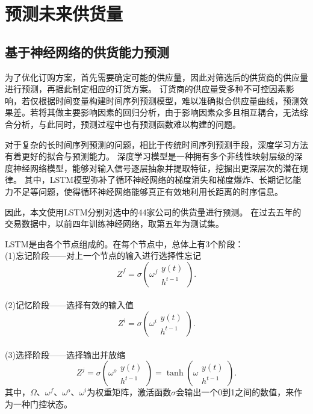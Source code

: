 
\section{预测未来供货量}
\subsection{基于神经网络的供货能力预测}

为了优化订购方案，首先需要确定可能的供应量，因此对筛选后的供货商的供应量进行预测，再据此制定相应的订货方案。
订货商的供应量受多种不可控因素影响，若仅根据时间变量构建时间序列预测模型，难以准确拟合供应量曲线，预测效果差。若将其做主要影响因素的回归分析，由于影响因素众多且相互耦合，无法综合分析，与此同时，预测过程中也有预测函数难以构建的问题\cite{李鹏2018基于长短期记忆的实时电价条件下智能电网短期负荷预测}。


对于复杂的长时间序列预测的问题，相比于传统时间序列预测手段，深度学习方法有着更好的拟合与预测能力。
深度学习模型是一种拥有多个非线性映射层级的深度神经网络模型，能够对输入信号逐层抽象并提取特征，挖掘出更深层次的潜在规律\cite{lecun2015deep}。
其中，LSTM模型弥补了循环神经网络的梯度消失和梯度爆炸、长期记忆能力不足等问题，使得循环神经网络能够真正有效地利用长距离的时序信息\cite{王鑫2018基于}。

因此，本文使用LSTM分别对选中的44家公司的供货量进行预测。
在过去五年的交易数据中，以前四年训练神经网络，取第五年为测试集。

LSTM是由各个节点组成的。在每个节点中，总体上有3个阶段：
\\
(1)忘记阶段——对上一个节点的输入进行选择性忘记
\begin{equation}
    Z^{f}=\sigma\left(\omega^{f} \begin{array}{l}
y(t) \\
h^{t-1}
\end{array}\right).
\end{equation}
\\
(2)记忆阶段——选择有效的输入值
\begin{equation}
    Z^{i}=\sigma\left(\omega^{i} \begin{array}{r}
y(t) \\
h^{t-1}
\end{array}\right).
\end{equation}
\\
(3)选择阶段——选择输出并放缩
\begin{equation}
Z^{j}=\sigma\left(\omega^{o} \begin{array}{r}
y(t) \\
h^{t-1}
\end{array}\right)=\tanh \left(\omega \begin{array}{r}
y(t)\\
h^{t-1}
\end{array}\right).
\end{equation}
其中，$\Omega$、$\omega^{f}$、$\omega^{o}$、$\omega^{i}$为权重矩阵，激活函数$\sigma$会输出一个0到1之间的数值，来作为一种门控状态。


